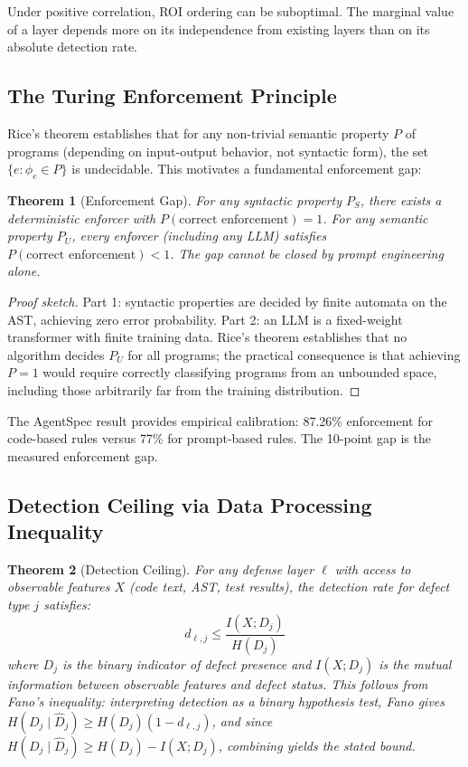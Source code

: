 \documentclass[11pt, a4paper]{googledeepmind}
\newtheorem{theorem}{Theorem}[section]
\begin{document}
Under positive correlation, ROI ordering can be suboptimal. The marginal value of a layer depends more on its independence from existing layers than on its absolute detection rate.

\subsection{The Turing Enforcement Principle}

Rice's theorem establishes that for any non-trivial semantic property $P$ of programs (depending on input-output behavior, not syntactic form), the set $\{e : \phi_e \in P\}$ is undecidable. This motivates a fundamental enforcement gap:

\begin{theorem}[Enforcement Gap]
\label{thm:enforcement-gap}
For any syntactic property $P_S$, there exists a deterministic enforcer with $P(\text{correct enforcement}) = 1$. For any semantic property $P_U$, every enforcer (including any LLM) satisfies $P(\text{correct enforcement}) < 1$. The gap cannot be closed by prompt engineering alone.
\end{theorem}

\begin{proof}[Proof sketch]
Part 1: syntactic properties are decided by finite automata on the AST, achieving zero error probability. Part 2: an LLM is a fixed-weight transformer with finite training data. Rice's theorem establishes that no algorithm decides $P_U$ for all programs; the practical consequence is that achieving $P = 1$ would require correctly classifying programs from an unbounded space, including those arbitrarily far from the training distribution.
\end{proof}

The AgentSpec result \citep{wang2026agentspec} provides empirical calibration: 87.26\% enforcement for code-based rules versus 77\% for prompt-based rules. The 10-point gap is the measured enforcement gap.

\subsection{Detection Ceiling via Data Processing Inequality}

\begin{theorem}[Detection Ceiling]
\label{thm:detection-ceiling}
For any defense layer $\ell$ with access to observable features $X$ (code text, AST, test results), the detection rate for defect type $j$ satisfies:
\begin{equation}
    d_{\ell,j} \leq \frac{I(X; D_j)}{H(D_j)}
\end{equation}
where $D_j$ is the binary indicator of defect presence and $I(X; D_j)$ is the mutual information between observable features and defect status. This follows from Fano's inequality: interpreting detection as a binary hypothesis test, Fano gives $H(D_j \mid \hat{D}_j) \geq H(D_j)(1 - d_{\ell,j})$, and since $H(D_j \mid \hat{D}_j) \geq H(D_j) - I(X; D_j)$, combining yields the stated bound.
\end{theorem}
\end{document}
